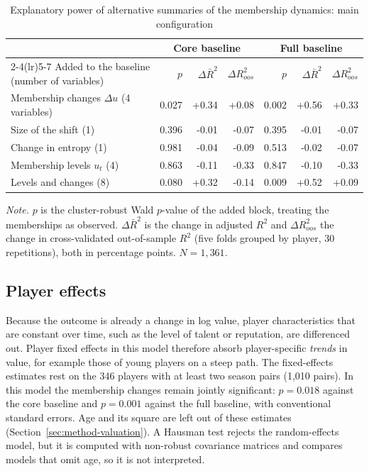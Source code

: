 \begin{table}[ht]
	\centering
	\small
	\caption{Explanatory power of alternative summaries of the membership dynamics: main configuration}
	\label{tab:comparison}
	\begin{tabular}{lrrrrrr}
		\toprule
		 & \multicolumn{3}{c}{Core baseline} & \multicolumn{3}{c}{Full baseline} \\
		\cmidrule(lr){2-4}\cmidrule(lr){5-7}
		Added to the baseline (number of variables) & $p$ & $\Delta\bar R^2$ & $\Delta R^2_{oos}$ & $p$ & $\Delta\bar R^2$ & $\Delta R^2_{oos}$ \\
		\midrule
Membership changes $\Delta u$ (4 variables) & 0.027 & +0.34 & +0.08 & 0.002 & +0.56 & +0.33 \\
Size of the shift (1) & 0.396 & -0.01 & -0.07 & 0.395 & -0.01 & -0.07 \\
Change in entropy (1) & 0.981 & -0.04 & -0.09 & 0.513 & -0.02 & -0.07 \\
Membership levels $u_t$ (4) & 0.863 & -0.11 & -0.33 & 0.847 & -0.10 & -0.33 \\
Levels and changes (8) & 0.080 & +0.32 & -0.14 & 0.009 & +0.52 & +0.09 \\
		\bottomrule
	\end{tabular}
	\par\smallskip
	\parbox{0.95\textwidth}{\footnotesize\emph{Note.} $p$ is the cluster-robust Wald $p$-value of the added block, treating the memberships as observed. $\Delta\bar R^2$ is the change in adjusted $R^2$ and $\Delta R^2_{oos}$ the change in cross-validated out-of-sample $R^2$ (five folds grouped by player, 30 repetitions), both in percentage points. $N=1{,}361$.}
\end{table}

\subsection{Player effects}

Because the outcome is already a change in log value, player characteristics that are constant over time, such as the level of talent or reputation, are differenced out. Player fixed effects in this model therefore absorb player-specific \emph{trends} in value, for example those of young players on a steep path. The fixed-effects estimates rest on the 346 players with at least two season pairs (1,010 pairs). In this model the membership changes remain jointly significant: $p=0.018$ against the core baseline and $p=0.001$ against the full baseline, with conventional standard errors. Age and its square are left out of these estimates (Section~\ref{sec:method-valuation}). A Hausman test rejects the random-effects model, but it is computed with non-robust covariance matrices and compares models that omit age, so it is not interpreted.

